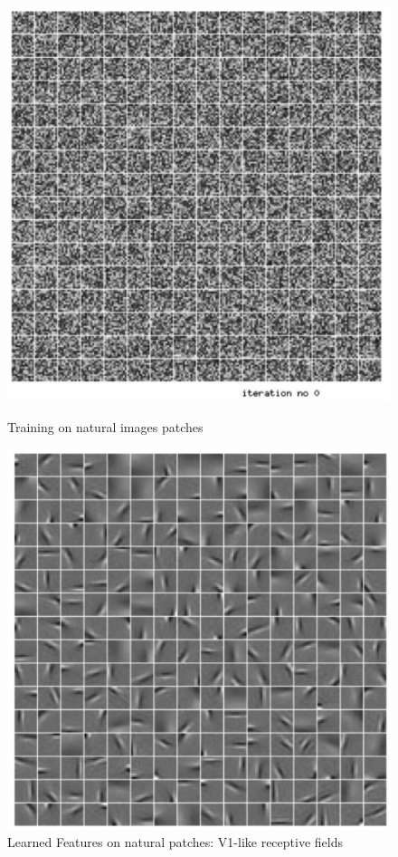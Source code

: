 \begin{figure}[H]

\begin{minipage}[b]{.4\textwidth}
  \includegraphics[width=\textwidth,left]{lectures/12-a/natural_0.png}
  \caption{Training on natural images patches}
  \label{natural_0}
\end{minipage}
\begin{minipage}[b]{.4\textwidth}
  \includegraphics[width=\textwidth,right]{lectures/12-a/natural.png}
  \caption{Learned Features on natural patches:
V1-like receptive fields}
  \label{natural}
\end{minipage}
\end{figure}

